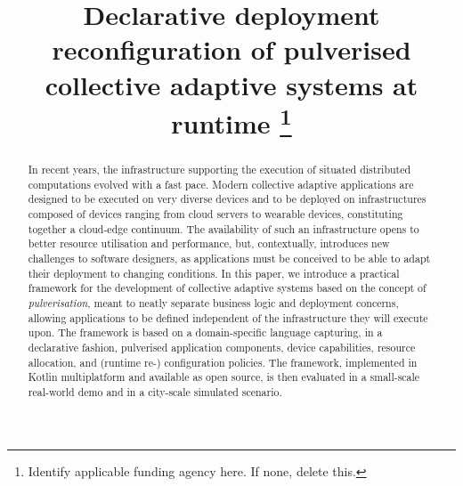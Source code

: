 \documentclass[conference]{IEEEtran}
\begin{document}
\title{Declarative deployment reconfiguration of pulverised collective adaptive systems at runtime
\thanks{Identify applicable funding agency here. If none, delete this.}
}

\author{
\and
{}
\and
{}
\and
{}
}

\maketitle

\begin{abstract}
In recent years,
the infrastructure supporting the execution of situated distributed computations
evolved with a fast pace.
%
Modern collective adaptive applications are designed to be executed on very diverse devices
and to be deployed on infrastructures composed of devices ranging from cloud servers to wearable devices,
constituting together a cloud-edge continuum.
%
The availability of such an infrastructure opens to better resource utilisation and performance,
but, contextually, introduces new challenges to software designers,
as applications must be conceived to be able to adapt their deployment to changing conditions.
%
In this paper,
we introduce a practical framework for the development of collective adaptive systems
based on the concept of \emph{pulverisation},
meant to neatly separate business logic and deployment concerns,
allowing applications to be defined independent of the infrastructure they will execute upon.
%
The framework is based on a domain-specific language capturing,
in a declarative fashion,
pulverised application components, device capabilities, resource allocation, and (runtime re-) configuration policies.
%
The framework, implemented in Kotlin multiplatform and available as open source,
is then evaluated in a small-scale real-world demo and in a city-scale simulated scenario.
\end{abstract}
\end{document}
